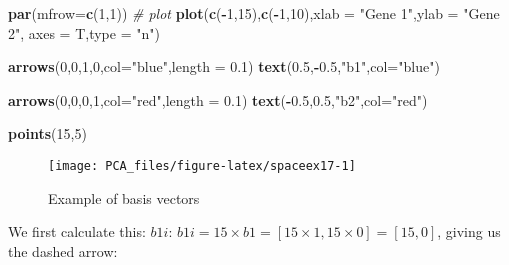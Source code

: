 \documentclass[
]{book}
\newenvironment{Shaded}{\begin{snugshade}}{\end{snugshade}}
\newcommand{\CommentTok}[1]{\textcolor[rgb]{0.56,0.35,0.01}{\textit{#1}}}
\newcommand{\DataTypeTok}[1]{\textcolor[rgb]{0.13,0.29,0.53}{#1}}
\newcommand{\DecValTok}[1]{\textcolor[rgb]{0.00,0.00,0.81}{#1}}
\newcommand{\FloatTok}[1]{\textcolor[rgb]{0.00,0.00,0.81}{#1}}
\newcommand{\KeywordTok}[1]{\textcolor[rgb]{0.13,0.29,0.53}{\textbf{#1}}}
\newcommand{\NormalTok}[1]{#1}
\newcommand{\OperatorTok}[1]{\textcolor[rgb]{0.81,0.36,0.00}{\textbf{#1}}}
\newcommand{\StringTok}[1]{\textcolor[rgb]{0.31,0.60,0.02}{#1}}
\theoremstyle{definition}
\theoremstyle{definition}
\theoremstyle{definition}
\theoremstyle{remark}
\begin{document}
\begin{Shaded}
\begin{Highlighting}[]
\KeywordTok{par}\NormalTok{(}\DataTypeTok{mfrow=}\KeywordTok{c}\NormalTok{(}\DecValTok{1}\NormalTok{,}\DecValTok{1}\NormalTok{))}
\CommentTok{# plot}
\KeywordTok{plot}\NormalTok{(}\KeywordTok{c}\NormalTok{(}\OperatorTok{-}\DecValTok{1}\NormalTok{,}\DecValTok{15}\NormalTok{),}\KeywordTok{c}\NormalTok{(}\OperatorTok{-}\DecValTok{1}\NormalTok{,}\DecValTok{10}\NormalTok{),}\DataTypeTok{xlab =} \StringTok{"Gene 1"}\NormalTok{,}\DataTypeTok{ylab =} \StringTok{"Gene 2"}\NormalTok{,}
 \DataTypeTok{axes =}\NormalTok{ T,}\DataTypeTok{type =} \StringTok{"n"}\NormalTok{)}

\KeywordTok{arrows}\NormalTok{(}\DecValTok{0}\NormalTok{,}\DecValTok{0}\NormalTok{,}\DecValTok{1}\NormalTok{,}\DecValTok{0}\NormalTok{,}\DataTypeTok{col=}\StringTok{"blue"}\NormalTok{,}\DataTypeTok{length =} \FloatTok{0.1}\NormalTok{)}
\KeywordTok{text}\NormalTok{(}\FloatTok{0.5}\NormalTok{,}\OperatorTok{-}\FloatTok{0.5}\NormalTok{,}\StringTok{"b1"}\NormalTok{,}\DataTypeTok{col=}\StringTok{"blue"}\NormalTok{)}

\KeywordTok{arrows}\NormalTok{(}\DecValTok{0}\NormalTok{,}\DecValTok{0}\NormalTok{,}\DecValTok{0}\NormalTok{,}\DecValTok{1}\NormalTok{,}\DataTypeTok{col=}\StringTok{"red"}\NormalTok{,}\DataTypeTok{length =} \FloatTok{0.1}\NormalTok{)}
\KeywordTok{text}\NormalTok{(}\OperatorTok{-}\FloatTok{0.5}\NormalTok{,}\FloatTok{0.5}\NormalTok{,}\StringTok{"b2"}\NormalTok{,}\DataTypeTok{col=}\StringTok{"red"}\NormalTok{)}


\KeywordTok{points}\NormalTok{(}\DecValTok{15}\NormalTok{,}\DecValTok{5}\NormalTok{)}
\end{Highlighting}
\end{Shaded}

\begin{figure}

{\centering \texttt{[image: PCA\_files/figure-latex/spaceex17-1]} 

}

\caption{Example of basis vectors}\label{fig:spaceex17}
\end{figure}

We first calculate this: \(b1i\): \(b1i=15 \times b1=[15 \times 1, 15 \times 0]=[15,0]\), giving us the dashed arrow:
\end{document}
